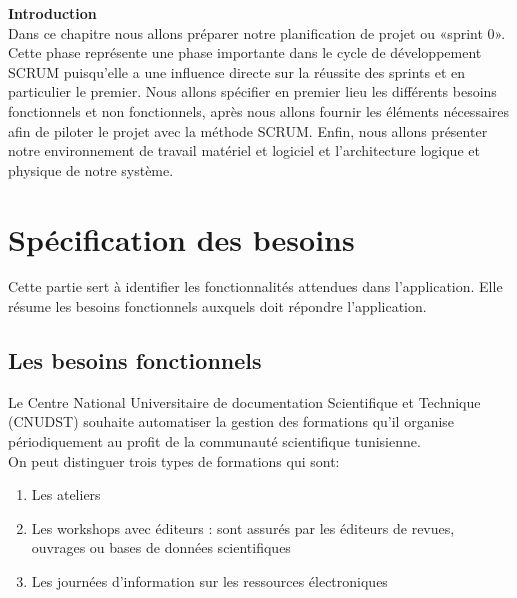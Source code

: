 
\textbf{Introduction}\\
Dans ce chapitre nous allons préparer notre planification de projet ou «sprint 0». Cette phase représente une phase importante dans le cycle de développement SCRUM puisqu’elle a une influence directe sur la
réussite des sprints et en particulier le premier.
Nous allons spécifier en premier lieu les différents besoins fonctionnels et non fonctionnels, après nous allons fournir les éléments nécessaires afin de piloter le projet avec la méthode SCRUM. Enfin, nous allons présenter notre environnement de travail matériel et logiciel et l'architecture logique et physique de notre système.   
\section{Spécification des besoins}
Cette partie sert à identifier les fonctionnalités attendues dans l’application. Elle résume les besoins fonctionnels auxquels doit répondre l’application.

\subsection{Les besoins fonctionnels}
Le Centre National Universitaire de documentation Scientifique et Technique (CNUDST)
souhaite automatiser la gestion des formations qu’il organise périodiquement au profit de
la communauté scientifique tunisienne.\\
On peut distinguer trois types de formations qui sont:
\begin{enumerate}
	\item Les ateliers
	\item Les workshops avec éditeurs : sont assurés par les éditeurs de revues, ouvrages ou bases de données scientifiques
	\item Les journées d’information sur les ressources électroniques
\end{enumerate}

